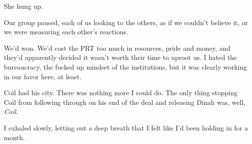 She hung up.



Our group paused, each of us looking to the others, as if we couldn't believe it, or we were measuring each other's reactions.



We'd won.  We'd cost the PRT too much in resources, pride and money, and they'd apparently decided it wasn't worth their time to uproot us.  I hated the bureaucracy, the fucked up mindset of the institutions, but it was clearly working in our favor here, at least.



Coil had his city.  There was nothing more I could do.  The only thing stopping Coil from following through on his end of the deal and releasing Dinah was, well, \emph{Coil}.



I exhaled slowly, letting out a deep breath that I felt like I'd been holding in for a month.





